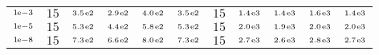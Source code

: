 \begin{tiny}
\begin{tabular}{@{$\;$}c@{$\;$}|@{$\;$}c@{$\;$}@{$\;$}c@{$\;$}@{$\;$}c@{$\;$}@{$\;$}c@{$\;$}@{$\;$}c@{$\;$}|@{$\;$}c@{$\;$}@{$\;$}c@{$\;$}@{$\;$}c@{$\;$}@{$\;$}c@{$\;$}@{$\;$}c@{$\;$}}
$\scriptstyle1\!\mathrm{\hspace{0.10em}e}-3$ & $\scriptstyle15$ & $\scriptstyle3.5\mathrm{\hspace{0.10em}e}2$ & $\scriptstyle2.9\mathrm{\hspace{0.10em}e}2$ & $\scriptstyle4.0\mathrm{\hspace{0.10em}e}2$ & $\scriptstyle3.5\mathrm{\hspace{0.10em}e}2$ & $\scriptstyle15$ & $\scriptstyle1.4\mathrm{\hspace{0.10em}e}3$ & $\scriptstyle1.4\mathrm{\hspace{0.10em}e}3$ & $\scriptstyle1.6\mathrm{\hspace{0.10em}e}3$ & $\scriptstyle1.4\mathrm{\hspace{0.10em}e}3$\\ 
$\scriptstyle1\!\mathrm{\hspace{0.10em}e}-5$ & $\scriptstyle15$ & $\scriptstyle5.3\mathrm{\hspace{0.10em}e}2$ & $\scriptstyle4.4\mathrm{\hspace{0.10em}e}2$ & $\scriptstyle5.8\mathrm{\hspace{0.10em}e}2$ & $\scriptstyle5.3\mathrm{\hspace{0.10em}e}2$ & $\scriptstyle15$ & $\scriptstyle2.0\mathrm{\hspace{0.10em}e}3$ & $\scriptstyle1.9\mathrm{\hspace{0.10em}e}3$ & $\scriptstyle2.0\mathrm{\hspace{0.10em}e}3$ & $\scriptstyle2.0\mathrm{\hspace{0.10em}e}3$\\ 
$\scriptstyle1\!\mathrm{\hspace{0.10em}e}-8$ & $\scriptstyle15$ & $\scriptstyle7.3\mathrm{\hspace{0.10em}e}2$ & $\scriptstyle6.6\mathrm{\hspace{0.10em}e}2$ & $\scriptstyle8.0\mathrm{\hspace{0.10em}e}2$ & $\scriptstyle7.3\mathrm{\hspace{0.10em}e}2$ & $\scriptstyle15$ & $\scriptstyle2.7\mathrm{\hspace{0.10em}e}3$ & $\scriptstyle2.6\mathrm{\hspace{0.10em}e}3$ & $\scriptstyle2.8\mathrm{\hspace{0.10em}e}3$ & $\scriptstyle2.7\mathrm{\hspace{0.10em}e}3$\\ 
\end{tabular} 
\end{tiny} 
